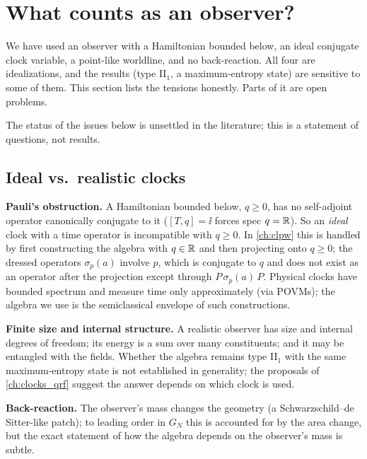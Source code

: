 \section{What counts as an observer?}\label{ch:what_observer}

\begin{physmotiv}
We have used an observer with a Hamiltonian bounded below, an ideal conjugate clock variable, a point-like worldline, and no back-reaction. All four are idealizations, and the results (type II$_1$, a maximum-entropy state) are sensitive to some of them. This section lists the tensions honestly. Parts of it are open problems.
\end{physmotiv}

\begin{unsettled}
The status of the issues below is unsettled in the literature; this is a statement of questions, not results.
\end{unsettled}

\subsection{Ideal vs.\ realistic clocks}

\textbf{Pauli's obstruction.} A Hamiltonian bounded below, $q\ge0$, has no self-adjoint operator canonically conjugate to it ($[T,q]=\ii$ forces spec $q=\mathbb{R}$). So an \emph{ideal} clock with a time operator is incompatible with $q\ge0$. In \cref{ch:clpw} this is handled by first constructing the algebra with $q\in\mathbb{R}$ and then projecting onto $q\ge0$; the dressed operators $\sigma_p(a)$ involve $p$, which is conjugate to $q$ and does not exist as an operator after the projection except through $P\,\sigma_p(a)\,P$. Physical clocks have bounded spectrum and measure time only approximately (via POVMs); the algebra we use is the semiclassical envelope of such constructions.

\textbf{Finite size and internal structure.} A realistic observer has size and internal degrees of freedom; its energy is a sum over many constituents; and it may be entangled with the fields. Whether the algebra remains type II$_1$ with the same maximum-entropy state is not established in generality; the proposals of \cref{ch:clocks_qrf} suggest the answer depends on which clock is used.

\textbf{Back-reaction.} The observer's mass changes the geometry (a Schwarzschild--de Sitter-like patch); to leading order in $G_N$ this is accounted for by the area change, but the exact statement of how the algebra depends on the observer's mass is subtle.

